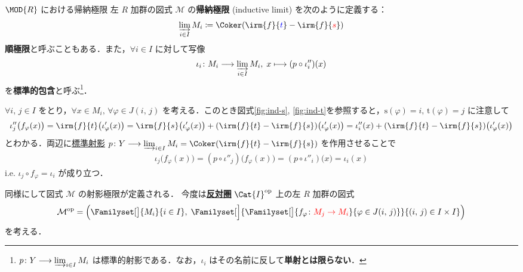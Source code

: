\documentclass[algtopo_main]{subfiles}
\begin{document}
\begin{mydef}[label=def:indlim]{$\MOD{R}$ における帰納極限}
	左 $R$ 加群の図式 $\mathcal{M}$ の\textbf{帰納極限} (inductive limit) を次のように定義する：
	\begin{align}
		\varinjlim_{i \in I} M_i \coloneqq \Coker (\irm{f}{\textcolor{blue}{t}} - \irm{f}{\textcolor{red}{s}})
	\end{align}
	\textbf{順極限}と呼ぶこともある．また，$\forall i \in I$ に対して写像
	\begin{align}
		\iota_i \colon M_i \longrightarrow \varinjlim_{i \in I} M_i,\; x \longmapsto (p \circ \iota_i'')(x)
	\end{align}
	を\textbf{標準的包含}と呼ぶ\footnote{$p \colon Y \longrightarrow \varinjlim_{i \in I} M_i$ は標準的射影である．なお，$\iota_i$ はその名前に反して\textbf{単射とは限らない}．}．
\end{mydef}

$\forall i,\, j \in I$ をとり，$\forall x \in M_i,\, \forall \varphi \in J(i,\, j)$ を考える．このとき図式\ref{fig:ind-s}, \ref{fig:ind-t}を参照すると，$\mathrm{s}(\varphi) = i,\,\mathrm{t}(\varphi) = j$ に注意して
\begin{align}
	\iota''_j \bigl( f_\varphi (x) \bigr) = \irm{f}{t} \bigl( \iota'_\varphi(x) \bigr) = \irm{f}{s}\bigl( \iota'_\varphi(x) \bigr) + (\irm{f}{t} - \irm{f}{s}) \bigl( \iota'_\varphi(x) \bigr) = \iota''_{i}(x) + (\irm{f}{t} - \irm{f}{s}) \bigl( \iota'_\varphi(x) \bigr)
\end{align}
とわかる．両辺に\hyperref[def:inj-proj]{標準射影} $p \colon Y \lto \varinjlim_{i \in I} M_i = \Coker (\irm{f}{t} - \irm{f}{s})$ を作用させることで
\begin{align}
	\iota_j \bigl( f_\varphi(x) \bigr)  = (p \circ \iota''_j)\bigl( f_\varphi (x) \bigr)  = (p \circ \iota''_i)\bigl(x\bigr) = \iota_i(x)
\end{align}
i.e. $\iota_j \circ f_{\varphi} = \iota_i$ が成り立つ．


同様にして図式 $\mathcal{M}$ の射影極限が定義される．
今度は\hyperref[def:opcategory]{\textbf{反対圏}} $\Cat{I}^{\mathrm{op}}$ 上の左 $R$ 加群の図式
\begin{align}
	\mathcal{M}^{\mathrm{op}} = \Bigl( \Familyset[\big]{M_i}{i \in I},\; \Familyset[\Big]{\Familyset[\big]{f_\varphi \colon \textcolor{red}{M_j \to M_i}}{\varphi \in J(i,\, j)}}{(i,\, j) \in I \times I} \Bigr)
\end{align}
を考える．
\end{document}
